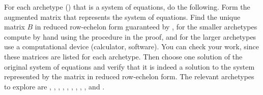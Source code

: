 For each archetype () that is a system of equations, do the following.  Form the augmented matrix that represents the system of equations.  Find the unique matrix $B$ in reduced row-echelon form guaranteed by , for the smaller archetypes compute by hand using the procedure in the proof, and  for the larger archetypes use a computational device (calculator, software).  You can check your work, since these matrices are listed for each archetype.  Then choose one solution of the original system of equations and verify that it is indeed a solution to the system represented by the matrix in reduced row-echelon form.  The relevant archetypes to explore are 
, 
, 
, 
, 
, 
, 
, 
, 
, and
.
